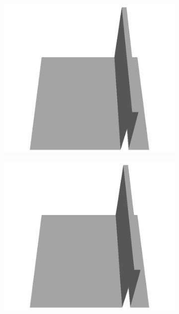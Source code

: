 \documentclass[../document.tex]{subfiles}
\begin{document}
\begin{figure}[H]
\begin{subfigure}[b]{0.065\textwidth}
    \includegraphics[width=\linewidth]{../img/5/custom_patches/walls_front/all/27-3d.png}
    \end{subfigure}
    \begin{subfigure}[b]{0.065\textwidth}
    \includegraphics[width=\linewidth]{../img/5/custom_patches/walls_front/all/26-3d.png}
    \end{subfigure}
    \begin{subfigure}[b]{0.065\textwidth}

\end{subfigure}
\end{figure}
\end{document}
